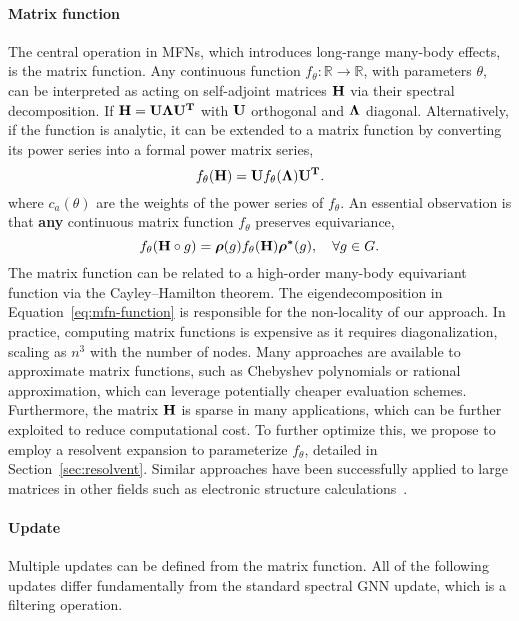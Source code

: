 \documentclass{article} \usepackage{iclr2024_conference,times}
\newcommand{\R}{\mathbb{R}}
\def\R{\mathbb{R}}
\begin{document}
\paragraph{Matrix function}
The central operation in MFNs, which introduces long-range many-body effects, is the matrix function.
Any continuous function $f_\theta : \R \to \R$, with parameters $\theta$, can be interpreted as acting on self-adjoint matrices ${\bf H}$ via their spectral decomposition. If ${\bf H} = {\bf U} \bf{\Lambda} {\bf U}^{T}$ with ${\bf U}$ orthogonal and ${\bf \Lambda}$ diagonal. Alternatively, if the function is analytic, it can be extended to a matrix function by converting its power series into a formal power matrix series,
\begin{equation}
\label{eq:mfn-function}
    f_{\theta}({\bf H}) 
    = {\bf U} f_{\theta}(\bf{\Lambda}) {\bf U}^{T}.
\end{equation}
where $c_a(\theta)$ are the weights of the power series of $f_{\theta}$. 
An essential observation is that \textbf{any} continuous matrix function $f_\theta$ preserves equivariance, 
\begin{equation}
\label{eq:mfn-equivariance}
    f_{\theta}({\bf H} \circ g )  = \bm{\rho}(g) f_{\theta}({\bf H}) \bm{\rho^{*}}(g), \quad \forall g \in G.
\end{equation}
The matrix function can be related to a high-order many-body equivariant function via the Cayley--Hamilton theorem.
The eigendecomposition in Equation~\ref{eq:mfn-function} is responsible for the non-locality of our approach. 
In practice, computing matrix functions is expensive as it requires diagonalization, scaling as $n^{3}$ with the number of nodes. 
Many approaches are available to approximate matrix functions, such as Chebyshev polynomials or rational approximation, which can leverage potentially cheaper evaluation schemes.
Furthermore, the matrix ${\bf H}$ is sparse in many applications, which can be further exploited to reduce computational cost. 
To further optimize this, we propose to employ a resolvent expansion to parameterize $f_\theta$, detailed in Section~\ref{sec:resolvent}. Similar approaches have been successfully applied to large matrices in other fields such as electronic structure calculations~\citep{pexsi_CMS2009,pexsi_JCPM2013}.

\paragraph{Update}
Multiple updates can be defined from the matrix function. All of the following updates differ fundamentally from the standard spectral GNN update, which is a filtering operation. 
\end{document}
